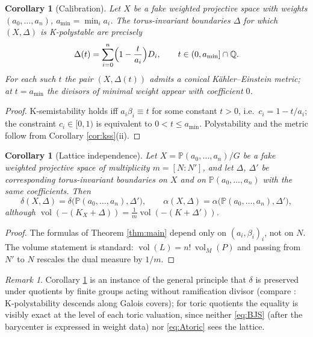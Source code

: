 \documentclass[11pt]{amsart}
\newtheorem{corollary}[theorem]{Corollary}
\theoremstyle{definition}
\theoremstyle{remark}
\newtheorem{remark}[theorem]{Remark}
\DeclareMathOperator{\Vol}{vol}
\newcommand{\Q}{\mathbb{Q}}
\newcommand{\PP}{\mathbb{P}}
\begin{document}
\begin{corollary}[Calibration]\label{cor:calibration}
Let \(X\) be a fake weighted projective space with weights
\((a_0,\dots,a_n)\), \(a_{\min}=\min_ia_i\). The torus-invariant
boundaries \(\Delta\) for which \((X,\Delta)\) is K-polystable are
precisely
\[
\Delta(t)=\sum_{i=0}^n\Bigl(1-\frac{t}{a_i}\Bigr)D_i,
\qquad t\in(0,a_{\min}]\cap\Q .
\]
For each such \(t\) the pair \((X,\Delta(t))\) admits a conical
K\"ahler--Einstein metric; at \(t=a_{\min}\) the divisors of minimal
weight appear with coefficient \(0\).
\end{corollary}

\begin{proof}
K-semistability holds iff \(a_i\beta_i\equiv t\) for some constant
\(t>0\), i.e.\ \(c_i=1-t/a_i\); the constraint \(c_i\in[0,1)\) is
equivalent to \(0<t\le a_{\min}\). Polystability and the metric follow
from Corollary \ref{cor:kss}(ii).
\end{proof}

\begin{corollary}[Lattice independence]\label{cor:lattice}
Let \(X=\PP(a_0,\dots,a_n)/G\) be a fake weighted projective space of
multiplicity \(m=[N:N']\), and let \(\Delta\), \(\Delta'\) be
corresponding torus-invariant boundaries on \(X\) and on
\(\PP(a_0,\dots,a_n)\) with the same coefficients. Then
\[
\delta(X,\Delta)=\delta\bigl(\PP(a_0,\dots,a_n),\Delta'\bigr),
\qquad
\alpha(X,\Delta)=\alpha\bigl(\PP(a_0,\dots,a_n),\Delta'\bigr),
\]
although \(\Vol(-(K_X+\Delta)) = \tfrac1m\Vol(-(K+\Delta'))\).
\end{corollary}

\begin{proof}
The formulas of Theorem \ref{thm:main} depend only on
\((a_i,\beta_i)_i\), not on \(N\). The volume statement is standard:
\(\Vol(L)=n!\,\Vol_M(P)\) and passing from \(N'\) to \(N\) rescales the
dual measure by \(1/m\).
\end{proof}

\begin{remark}
Corollary \ref{cor:lattice} is an instance of the general principle that
\(\delta\) is preserved under quotients by finite groups acting without
ramification divisor (compare \cite{LZ22,Zhu21}: K-polystability descends
along Galois covers); for toric quotients the equality is visibly exact at
the level of each toric valuation, since neither \eqref{eq:BJS} (after the
barycenter is expressed in weight data) nor \eqref{eq:Atoric} sees the
lattice.
\end{remark}
\end{document}
